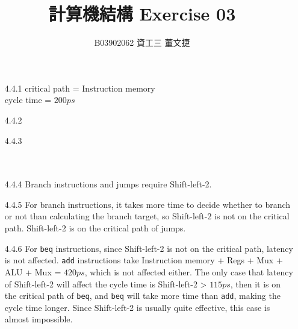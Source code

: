 \documentclass[12pt, a4paper]{article}
\date{}
\title{\vspace{-3.0cm} 計算機結構 \hspace{0cm} Exercise 03 \\ \vspace{0cm}}
\author{\normalsize B03902062 \hspace{0cm} 資工三 \hspace{0cm} 董文捷}
\begin{document}
\maketitle
\begin{itemize}[font=\bfseries]

\item[4.4.1]
critical path = Instruction memory \\
cycle time = $200ps$ 
\item[4.4.2]
 \\
\item[4.4.3]
 \\
 \\
 \\
\item[4.4.4]
Branch instructions and jumps require Shift-left-2.
\item[4.4.5]
For branch instructions, it takes more time to decide whether to branch or not than calculating the branch target, so Shift-left-2 is not on the critical path. Shift-left-2 is on the critical path of jumps.
\item[4.4.6]
For \texttt{beq} instructions, since Shift-left-2 is not on the critical path, latency is not affected. \texttt{add} instructions take Instruction memory + Regs + Mux + ALU + Mux = $420ps$, which is not affected either. The only case that latency of Shift-left-2 will affect the cycle time is Shift-left-2 > $115ps$, then it is on the critical path of \texttt{beq}, and \texttt{beq} will take more time than \texttt{add}, making the cycle time longer. Since Shift-left-2 is usually quite effective, this case is almost impossible.


\end{itemize}
\end{document}
